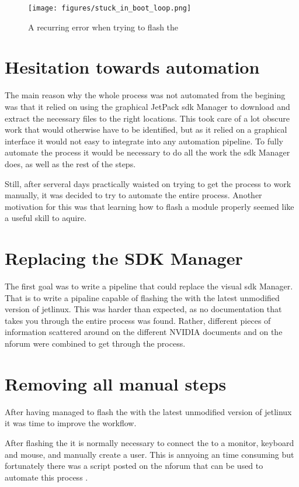 \begin{figure}[H]
    \centering
    \texttt{[image: figures/stuck\_in\_boot\_loop.png]}
    \caption{A recurring error when trying to flash the \jx}
    \label{fig:stuck_in_boot_loop}
\end{figure}

\section{Hesitation towards automation}
The main reason why the whole process was not automated from the begining was that it relied on using the graphical JetPack \gls{sdk} Manager to download and extract the necessary files to the right locations.
This took care of a lot obscure work that would otherwise have to be identified, but as it relied on a graphical interface it would not easy to integrate into any automation pipeline.
To fully automate the process it would be necessary to do all the work the \gls{sdk} Manager does, as well as the rest of the steps.

Still, after serveral days practically waisted on trying to get the process to work manually, it was decided to try to automate the entire process.
Another motivation for this was that learning how to flash a \jetson module properly seemed like a useful skill to aquire.

\section{Replacing the SDK Manager}
The first goal was to write a pipeline that could replace the visual \gls{sdk} Manager.
That is to write a pipaline capable of flashing the \jx with the latest unmodified version of \gls{jetlinux}.
This was harder than expected, as no documentation that takes you through the entire process was found.
Rather, different pieces of information scattered around on the different NVIDIA documents and on the \gls{nforum} were combined to get through the process.


\section{Removing all manual steps}
After having managed to flash the \jx with the latest unmodified version of \gls{jetlinux} it was time to improve the workflow.

After flashing the \jx it is normally necessary to connect the \jx to a monitor, keyboard and mouse, and manually create a user.
This is annyoing an time consuming but fortunately there was a script posted on the \gls{nforum} that can be used to automate this process \cite{waynewwwScriptBypassAccountJun2819}.

